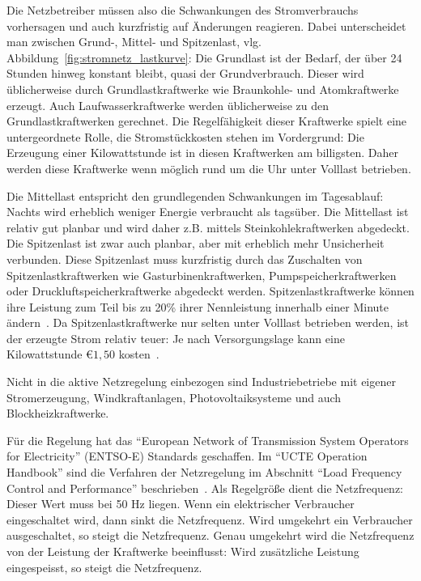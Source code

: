 \documentclass[12pt,BCOR=8.5mm]{scrartcl}
\begin{document}
\begin{enumerate}
    Die Netzbetreiber müssen also die Schwankungen des Stromverbrauchs
    vorhersagen und auch kurzfristig auf Änderungen reagieren. Dabei
    unterscheidet man zwischen Grund-, Mittel- und Spitzenlast, vlg.
    Abbildung~\ref{fig:stromnetz_lastkurve}: Die
    Grundlast ist der Bedarf, der über 24 Stunden hinweg konstant
    bleibt, quasi der Grundverbrauch. Dieser wird üblicherweise durch
    Grundlastkraftwerke wie Braunkohle- und Atomkraftwerke erzeugt. Auch
    Laufwasserkraftwerke werden üblicherweise zu den
    Grundlastkraftwerken gerechnet. Die Regelfähigkeit dieser Kraftwerke
    spielt eine untergeordnete Rolle, die Stromstückkosten stehen im
    Vordergrund: Die Erzeugung einer Kilowattstunde ist in diesen
    Kraftwerken am billigsten. Daher werden diese Kraftwerke wenn
    möglich rund um die Uhr unter Volllast betrieben.

    Die Mittellast entspricht den grundlegenden Schwankungen im
    Tagesablauf: Nachts wird erheblich weniger Energie verbraucht als
    tagsüber. Die Mittellast ist relativ gut planbar und
    wird daher z.B. mittels Steinkohlekraftwerken abgedeckt. Die
    Spitzenlast ist zwar auch planbar, aber mit erheblich mehr
    Unsicherheit verbunden. Diese Spitzenlast muss kurzfristig durch das
    Zuschalten von Spitzenlastkraftwerken wie Gasturbinenkraftwerken,
    Pumpspeicherkraftwerken oder Druckluftspeicherkraftwerke abgedeckt
    werden. Spitzenlastkraftwerke können ihre Leistung zum Teil bis zu
    20\% ihrer Nennleistung innerhalb einer Minute
    ändern~\cite{wikipedia10spitzenlast}. Da Spitzenlastkraftwerke
    nur selten unter Volllast betrieben werden, ist der erzeugte Strom
    relativ teuer: Je nach Versorgungslage kann eine Kilowattstunde
    $\euro 1,50$ kosten~\cite{wikipedia10regelleistung}. 

    Nicht in die aktive Netzregelung einbezogen sind Industriebetriebe
    mit eigener Stromerzeugung, Windkraftanlagen, Photovoltaiksysteme
    und auch Blockheizkraftwerke. 

    Für die Regelung hat das "`European Network of Transmission System
    Operators for Electricity"' (ENTSO-E) Standards geschaffen. Im
    "`UCTE Operation Handbook"' sind die Verfahren der Netzregelung im
    Abschnitt "`Load Frequency Control and Performance"'
    beschrieben~\cite{entsoe10ucte}. Als Regelgröße dient die
    Netzfrequenz: Dieser Wert muss bei 50 Hz liegen. Wenn ein
    elektrischer Verbraucher eingeschaltet wird, dann sinkt die
    Netzfrequenz. Wird umgekehrt ein Verbraucher ausgeschaltet, so
    steigt die Netzfrequenz. Genau umgekehrt wird die Netzfrequenz von
    der Leistung der Kraftwerke beeinflusst: Wird zusätzliche Leistung
    eingespeisst, so steigt die Netzfrequenz.


\end{enumerate}
\end{document}
